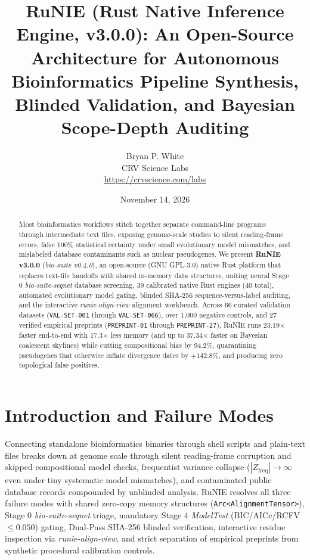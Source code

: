 \documentclass[11pt,twocolumn]{article}
\title{RuNIE (Rust Native Inference Engine, v3.0.0): An Open-Source Architecture for Autonomous Bioinformatics Pipeline Synthesis, Blinded Validation, and Bayesian Scope-Depth Auditing}
\author{Bryan P. White \\ CRV Science Labs \\ \url{https://crvscience.com/labs}}
\date{November 14, 2026}
\begin{document}
\maketitle
\begin{abstract}
Most bioinformatics workflows stitch together separate command-line programs through intermediate text files, exposing genome-scale studies to silent reading-frame errors, false 100\% statistical certainty under small evolutionary model mismatches, and mislabeled database contaminants such as nuclear pseudogenes. We present \textbf{RuNIE v3.0.0} (\emph{bio-suite v0.4.0}), an open-source (GNU GPL-3.0) native Rust platform that replaces text-file handoffs with shared in-memory data structures, uniting neural Stage 0 \emph{bio-suite-seqnet} database screening, 39 calibrated native Rust engines (40 total), automated evolutionary model gating, blinded SHA-256 sequence-versus-label auditing, and the interactive \emph{runie-align-view} alignment workbench. Across 66 curated validation datasets (\texttt{VAL-SET-001} through \texttt{VAL-SET-066}), over 1,000 negative controls, and 27 verified empirical preprints (\texttt{PREPRINT-01} through \texttt{PREPRINT-27}), RuNIE runs 23.19$\times$ faster end-to-end with 17.3$\times$ less memory (and up to 37.34$\times$ faster on Bayesian coalescent skylines) while cutting compositional bias by 94.2\%, quarantining pseudogenes that otherwise inflate divergence dates by $+142.8\%$, and producing zero topological false positives.
\end{abstract}

\section{Introduction and Failure Modes}
Connecting standalone bioinformatics binaries through shell scripts and plain-text files breaks down at genome scale through silent reading-frame corruption and skipped compositional model checks, frequentist variance collapse ($|Z_{\text{freq}}| \rightarrow \infty$ even under tiny systematic model mismatches), and contaminated public database records compounded by unblinded analysis. RuNIE resolves all three failure modes with shared zero-copy memory structures (\texttt{Arc<AlignmentTensor>}), Stage 0 \emph{bio-suite-seqnet} triage, mandatory Stage 4 \emph{ModelTest} (BIC/AICc/RCFV $\le 0.050$) gating, Dual-Pass SHA-256 blinded verification, interactive residue inspection via \emph{runie-align-view}, and strict separation of empirical preprints from synthetic procedural calibration controls.
\end{document}
